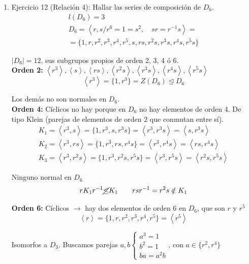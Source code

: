 \documentclass{article}
\begin{document}
\begin{enumerate}[1)]
\item Ejercicio 12 (Relación 4): Hallar las series de composición de $D_6$.
\begin{gather*}
l(D_6)=3 \\
D_6=\left\langle r,s/r^6=1=s^2,\quad sr=r^{-1}s\right\rangle =\\
=\{1,r,r^2,r^3,r^4,r^5,s,rs,r^2s,r^3s,r^4s,r^5s\}
\end{gather*}

$|D_6|=12$, sus subgrupos propios de orden 2, 3, 4 ó 6. \\

\textbf{Orden 2:} $\left\langle r^3\right\rangle, \left\langle s\right\rangle, \left\langle rs\right\rangle, \left\langle r^2s\right\rangle, \left\langle r^3s\right\rangle, \left\langle r^4s\right\rangle, \left\langle r^5s\right\rangle$
\begin{equation*}
\left\langle r^3\right\rangle =\{1,r^3\}=Z(D_6)\unlhd D_6
\end{equation*}

Los demás no son normales en $D_6$. \\

\textbf{Orden 4:} Cíclicos no hay porque en $D_6$ no hay elementos de orden 4. De tipo Klein (parejas de elementos de orden 2 que conmutan entre sí).
\begin{gather*}
K_1=\left\langle r^3,s\right\rangle=\{1,r^3,s,r^3s\}=\left\langle r^3,r^3s\right\rangle = \left\langle s,r^3s\right\rangle\\
K_2=\left\langle r^3,rs\right\rangle =\{1,r^3,rs,r^4s\}=\left\langle r^3,r^4s\right\rangle =\left\langle rs,r^4s\right\rangle \\
K_3=\left\langle r^3,r^2s\right\rangle =\{1,r^3,r^2s,r^5s\}=\left\langle r^3,r^5s\right\rangle = \left\langle r^2s,r^5s\right\rangle
\end{gather*}

Ninguno normal en $D_6$
\begin{equation*}
rK_1r^{-1}\cancel{\leq} K_1\qquad rsr^{-1}=r^2s\notin K_1
\end{equation*}

\textbf{Orden 6:} Cíclicos $\rightarrow$ hay dos elementos de orden 6 en $D_6$, que son $r$ y $r^5$
\begin{equation*}
\left\langle r \right\rangle = \{1,r,r^2,r^3,r^4,r^5\}=\left\langle r^5\right\rangle
\end{equation*}

Isomorfos a $D_3$. Buscamos parejas $a,b\left\lbrace \begin{array}{c}
a^3=1\\
b^2=1\\
ba=a^2b
\end{array}\right.$, con $a\in\{r^2,r^4\}$


\end{enumerate}
\end{document}
